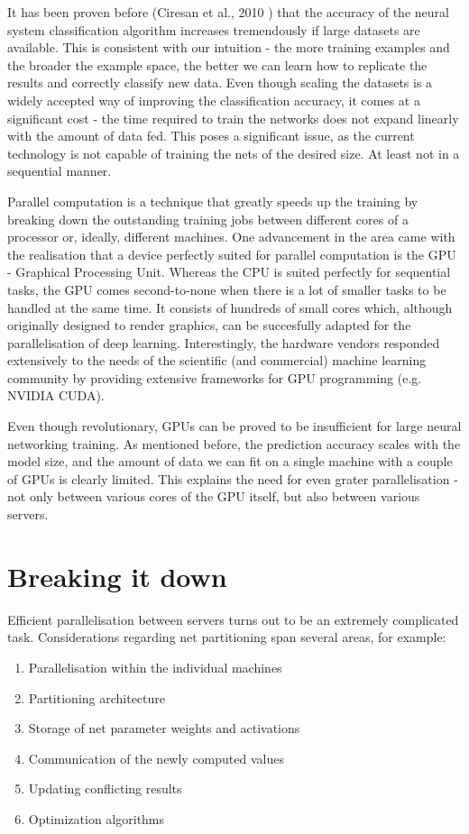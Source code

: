 \documentclass[a4paper, 12pt]{article}
\numberwithin{equation}{section}
\begin{document}
	It has been proven before (Ciresan et al., 2010 \cite{ciresan2010deep}) that the accuracy of the neural system classification algorithm increases tremendously if large datasets are available. This is consistent with our intuition - the more training examples and the broader the example space, the better we can learn how to replicate the results and correctly classify new data. Even though scaling the datasets is a widely accepted way of improving the classification accuracy, it comes at a significant cost - the time required to train the networks does not expand linearly with the amount of data fed. This poses a significant issue, as the current technology is not capable of training the nets of the desired size. At least not in a sequential manner.
	
	Parallel computation is a technique that greatly speeds up the training by breaking down the outstanding training jobs between different cores of a processor or, ideally, different machines. One advancement in the area came with the realisation that a device perfectly suited for parallel computation is the GPU - Graphical Processing Unit. Whereas the CPU is suited perfectly for sequential tasks, the GPU comes second-to-none when there is a lot of smaller tasks to be handled at the same time. It consists of hundreds of small cores which, although originally designed to render graphics, can be succesfully adapted for the parallelisation of deep learning. Interestingly, the hardware vendors responded extensively to the needs of the scientific (and commercial) machine learning community by providing extensive frameworks for GPU programming (e.g. NVIDIA CUDA).
	
	Even though revolutionary, GPUs can be proved to be insufficient for large neural networking training. As mentioned before, the prediction accuracy scales with the model size, and the amount of data we can fit on a single machine with a couple of GPUs is clearly limited. This explains the need for even grater parallelisation - not only between various cores of the GPU itself, but also between various servers. 
	
	\section{Breaking it down}
	\label{breakingitdown}
	
	Efficient parallelisation between servers turns out to be an extremely complicated task. Considerations regarding net partitioning span several areas, for example:
	\begin{enumerate}
		\item Parallelisation within the individual machines
		\item Partitioning architecture
		\item Storage of net parameter weights and activations
		\item Communication of the newly computed values
		\item Updating conflicting results
		\item Optimization algorithms
	\end{enumerate}
	
\end{document}

